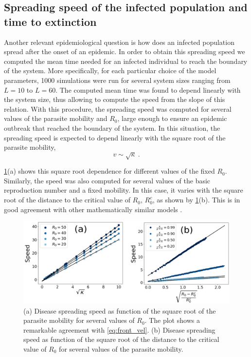 \subsection{Spreading speed of the infected population and time to extinction}

Another relevant epidemiological question is how does an infected
population spread after the onset of an epidemic. In order to obtain this
spreading speed we computed the mean time needed for an infected individual to
reach the boundary of the system. More specifically, for each particular choice
of the model parameters, 1000 simulations were run for several system sizes
ranging from $L=10$ to $L=60$. The computed mean time was found to depend
linearly with the system size, thus allowing to compute the speed from the
slope of this relation. With this procedure, the spreading speed was computed
for several values of the parasite mobility and $R_0$, large enough to ensure
an epidemic outbreak that reached the boundary of the system. In this
situation, the spreading speed is expected to depend linearly with the square
root of the parasite mobility,
\begin{equation}\label{eq:front_vel}
    v\sim\sqrt{\kappa} \ .
\end{equation}

\cref{fig:front_velocity}(a) shows this square root dependence for
different values of the fixed $R_0$. Similarly, the speed was also computed for
several values of the basic reproduction number and a fixed mobility. In this
case, it varies with the square root of the distance to the critical value of
$R_0$, $R_0^c$, as shown by \cref{fig:front_velocity}(b). This is in good
agreement with other mathematically similar models \cite{Bertuzzo2010}.

\begin{figure}[H]
    \centering
    \includegraphics[width=1\textwidth]{Figures/Front_velocity.png}
    \caption[
        Analysis of the spreading speed of the infected population
    ]{(a) Disease spreading speed as function of the square root of
        the parasite mobility for several values of $R_0$. The plot shows a
        remarkable
        agreement with \cref{eq:front_vel}. (b) Disease spreading speed as
        function of
        the square root of the distance to the critical value of $R_0$ for
        several
        values of the parasite mobility.}
    \label{fig:front_velocity}
\end{figure}

